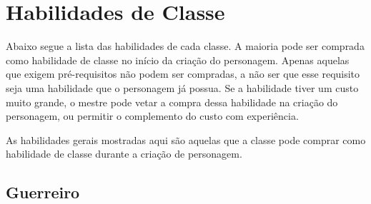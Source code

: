 \section{Habilidades de Classe}

Abaixo segue a lista das habilidades de cada classe. A maioria pode ser comprada como habilidade de classe no início da criação do personagem. Apenas aquelas que exigem pré-requisitos não podem ser compradas, a não ser que esse requisito seja uma habilidade que o personagem já possua. Se a habilidade tiver um custo muito grande, o mestre pode vetar a compra dessa habilidade na criação do personagem, ou permitir o complemento do custo com experiência.

As habilidades gerais mostradas aqui são aquelas que a classe pode comprar como habilidade de classe durante a criação de personagem.

\subsection{Guerreiro}
 
